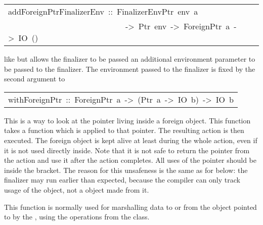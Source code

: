 \begin{haddockdesc}
\item[\begin{tabular}{@{}l}
addForeignPtrFinalizerEnv\ ::\ FinalizerEnvPtr\ env\ a\\\ \ \ \ \ \ \ \ \ \ \ \ \ \ \ \ \ \ \ \ \ \ \ \ \ \ \ \ \ ->\ Ptr\ env\ ->\ ForeignPtr\ a\ ->\ IO\ ()
\end{tabular}]\haddockbegindoc
like  but allows the finalizer to be
 passed an additional environment parameter to be passed to the
 finalizer.  The environment passed to the finalizer is fixed by the
 second argument to 
\par

\end{haddockdesc}
\begin{haddockdesc}
\item[\begin{tabular}{@{}l}
withForeignPtr\ ::\ ForeignPtr\ a\ ->\ (Ptr\ a\ ->\ IO\ b)\ ->\ IO\ b
\end{tabular}]\haddockbegindoc
This is a way to look at the pointer living inside a
 foreign object.  This function takes a function which is
 applied to that pointer. The resulting  action is then
 executed. The foreign object is kept alive at least during
 the whole action, even if it is not used directly
 inside. Note that it is not safe to return the pointer from
 the action and use it after the action completes. All uses
 of the pointer should be inside the
  bracket.  The reason for
 this unsafeness is the same as for
  below: the finalizer
 may run earlier than expected, because the compiler can only
 track usage of the  object, not
 a  object made from it.
\par
This function is normally used for marshalling data to
 or from the object pointed to by the
 , using the operations from the
  class.
\par

\end{haddockdesc}
